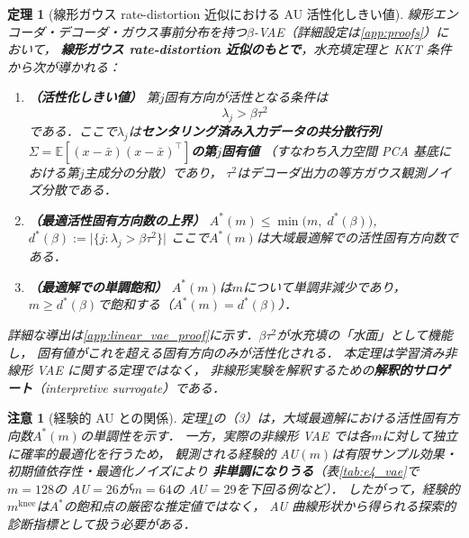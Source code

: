 \documentclass[11pt,a4paper]{jsarticle}
\newtheorem{theorem}{定理}
\newtheorem{remark}{注意}
\newcommand{\mknee}{m^{\mathrm{knee}}}
\begin{document}
\begin{theorem}[線形ガウス rate-distortion 近似における AU 活性化しきい値]\label{thm:linear_vae}
線形エンコーダ・デコーダ・ガウス事前分布を持つ$\beta$-VAE（詳細設定は\ref{app:proofs}）において，
\textbf{線形ガウス rate-distortion 近似のもとで}，水充填定理と KKT 条件から次が導かれる：

\begin{enumerate}
  \item \textbf{（活性化しきい値）} 第$j$固有方向が活性となる条件は
        \begin{equation}
          \lambda_j > \beta \tau^2 \label{eq:au_threshold}
        \end{equation}
        である．ここで$\lambda_j$は\textbf{センタリング済み入力データの共分散行列
        $\Sigma = \mathbb{E}[(x-\bar{x})(x-\bar{x})^\top]$の第$j$固有値}
        （すなわち入力空間 PCA 基底における第$j$主成分の分散）であり，
        $\tau^2$はデコーダ出力の等方ガウス観測ノイズ分散である．
  \item \textbf{（最適活性固有方向数の上界）}
        $A^*(m) \leq \min\bigl(m,\; d^*(\beta)\bigr)$,\quad
        $d^*(\beta) := \bigl|\{j : \lambda_j > \beta\tau^2\}\bigr|$
        \newline
        ここで$A^*(m)$は大域最適解での活性固有方向数である．
  \item \textbf{（最適解での単調飽和）}
        $A^*(m)$は$m$について単調非減少であり，
        $m \geq d^*(\beta)$で飽和する（$A^*(m) = d^*(\beta)$）．
\end{enumerate}

\noindent
詳細な導出は\ref{app:linear_vae_proof}に示す．$\beta\tau^2$が水充填の「水面」として機能し，
固有値がこれを超える固有方向のみが活性化される．
本定理は学習済み非線形 VAE に関する定理ではなく，
非線形実験を解釈するための\textbf{解釈的サロゲート}（interpretive surrogate）である．

\end{theorem}

\begin{remark}[経験的 AU との関係]
定理\ref{thm:linear_vae}の（3）は，大域最適解における活性固有方向数$A^*(m)$の単調性を示す．
一方，実際の非線形 VAE では各$m$に対して独立に確率的最適化を行うため，
観測される経験的 AU$(m)$は有限サンプル効果・初期値依存性・最適化ノイズにより
\textbf{非単調になりうる}（表\ref{tab:e4_vae}で$m=128$の AU$=26$が$m=64$の AU$=29$を下回る例など）．
したがって，経験的$\mknee$は$A^*$の飽和点の厳密な推定値ではなく，
AU 曲線形状から得られる探索的診断指標として扱う必要がある．
\end{remark}
\end{document}
